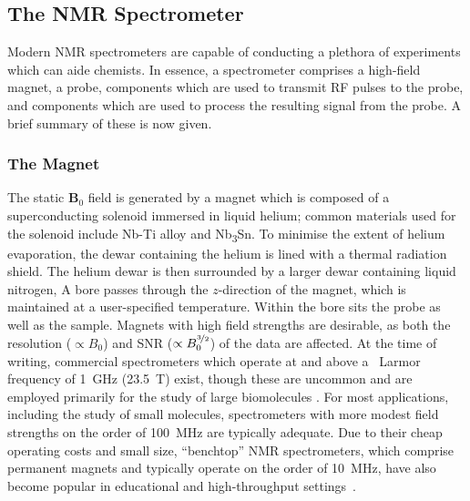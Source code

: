 \subsection{The NMR Spectrometer}

Modern \ac{NMR} spectrometers are capable of conducting a plethora of
experiments which can aide chemists.
In essence, a spectrometer comprises a high-field magnet, a probe, components
which are used to transmit \ac{RF} pulses to the probe, and components which
are used to process the resulting signal from the probe. A brief summary of
these is now given.

\subsubsection{The Magnet}
The static $\symbf{B}_0$ field is generated by a magnet which is composed of a
superconducting solenoid immersed in liquid helium; common materials used for
the solenoid include Nb-Ti alloy and Nb\textsubscript{3}Sn. To minimise the
extent of helium evaporation, the dewar containing the helium is lined with
a thermal radiation shield. The helium dewar is then surrounded by a larger
dewar containing liquid nitrogen,
A bore passes through the $z$-direction of
the magnet, which is maintained at a user-specified temperature. Within the
bore sits the probe as well as the sample. Magnets with high field
strengths are desirable, as both the resolution ($\propto B_0$) and \ac{SNR}
($\propto B_0^{\nicefrac{3}{2}}$) of the data are affected. At the
time of writing, commercial spectrometers which operate at and above a
\proton\ Larmor frequency of \qty{1}{\giga\hertz} (\qty{23.5}{\tesla}) exist,
though these are uncommon and are employed primarily for the study of large
biomolecules
.
For most applications, including
the study of small molecules, spectrometers with more modest field strengths on
the order of \qty{100}{\mega\hertz} are typically adequate. Due to their cheap
operating costs and small size, ``benchtop'' \ac{NMR} spectrometers, which
comprise permanent magnets and typically operate on the order of
\qty{10}{\mega\hertz}, have also become popular in educational and
high-throughput settings~\cite{Giberson2021}.


